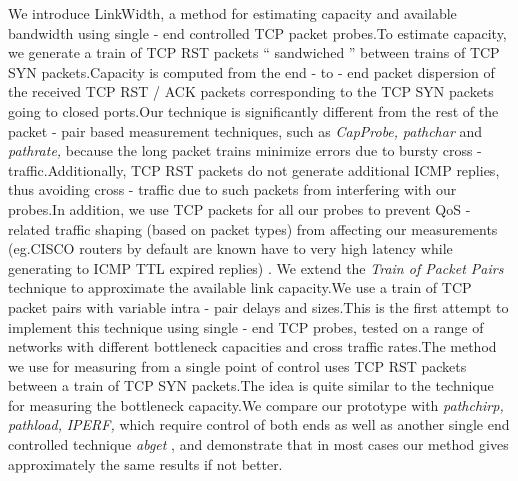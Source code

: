 We introduce LinkWidth, a method for estimating capacity and available
  bandwidth using single - end controlled TCP packet probes.To estimate
  capacity, we generate a train of TCP RST packets `` sandwiched ''
  between trains of TCP SYN packets.Capacity is computed from the
  end - to - end packet dispersion of the received TCP RST / ACK packets
  corresponding to the TCP SYN packets going to closed ports.Our
  technique is significantly different from the rest of the packet - pair
  based measurement techniques, such as
{
\em CapProbe,}
{
  \em
    pathchar}
    and
    {
    \em pathrate,}
  because the long packet trains minimize errors due
    to bursty cross - traffic.Additionally, TCP RST packets
  do
    not generate
      additional ICMP replies, thus avoiding cross - traffic due to such
      packets from interfering with our probes.In addition, we use TCP
      packets for all our probes to prevent QoS - related traffic shaping
      (based on packet types)
  from affecting our measurements (eg.CISCO
				     routers by default are known have to very
				   high latency while generating to ICMP TTL
				   expired replies)
    . We extend the
    {
    \it Train of Packet Pairs}
  technique to approximate the
    available link capacity.We use a train of TCP packet pairs with
    variable intra - pair delays and sizes.This is the first attempt to
    implement this technique using single - end TCP probes, tested on a
    range of networks with different bottleneck capacities and cross
    traffic rates.The method we use for measuring from a single point of
    control uses TCP RST packets between a train of TCP SYN packets.The
    idea is quite similar to the technique for measuring the bottleneck
    capacity.We compare our prototype with
  {
  \em pathchirp,}
  {
    \em
      pathload,}
      {
      \em IPERF,}
    which require control of both ends as well as
      another single end controlled technique
    {
    \em abget}
     , and demonstrate
      that in most cases our method gives approximately the same results if
      not better.
